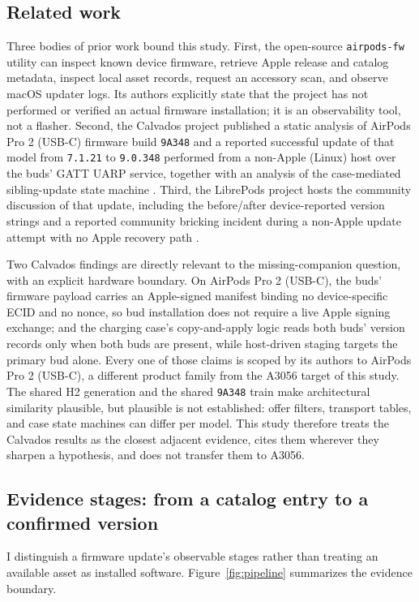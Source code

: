 \documentclass[11pt,letterpaper]{article}
\begin{document}
\subsection{Related work}
Three bodies of prior work bound this study. First, the open-source \texttt{airpods-fw} utility \cite{airpodsfw} can inspect known device firmware, retrieve Apple release and catalog metadata, inspect local asset records, request an accessory scan, and observe macOS updater logs. Its authors explicitly state that the project has not performed or verified an actual firmware installation; it is an observability tool, not a flasher. Second, the Calvados project published a static analysis of AirPods Pro 2 (USB-C) firmware build \texttt{9A348} and a reported successful update of that model from \texttt{7.1.21} to \texttt{9.0.348} performed from a non-Apple (Linux) host over the buds' GATT UARP service, together with an analysis of the case-mediated sibling-update state machine \cite{calvados}. Third, the LibrePods project hosts the community discussion of that update, including the before/after device-reported version strings and a reported community bricking incident during a non-Apple update attempt with no Apple recovery path \cite{librepods612}.

Two Calvados findings are directly relevant to the missing-companion question, with an explicit hardware boundary. On AirPods Pro 2 (USB-C), the buds' firmware payload carries an Apple-signed manifest binding no device-specific ECID and no nonce, so bud installation does not require a live Apple signing exchange; and the charging case's copy-and-apply logic reads both buds' version records only when both buds are present, while host-driven staging targets the primary bud alone. Every one of those claims is scoped by its authors to AirPods Pro 2 (USB-C), a different product family from the A3056 target of this study. The shared H2 generation and the shared \texttt{9A348} train make architectural similarity plausible, but plausible is not established: offer filters, transport tables, and case state machines can differ per model. This study therefore treats the Calvados results as the closest adjacent evidence, cites them wherever they sharpen a hypothesis, and does not transfer them to A3056.

\subsection{Evidence stages: from a catalog entry to a confirmed version}
I distinguish a firmware update's observable stages rather than treating an available asset as installed software. Figure~\ref{fig:pipeline} summarizes the evidence boundary.
\end{document}
